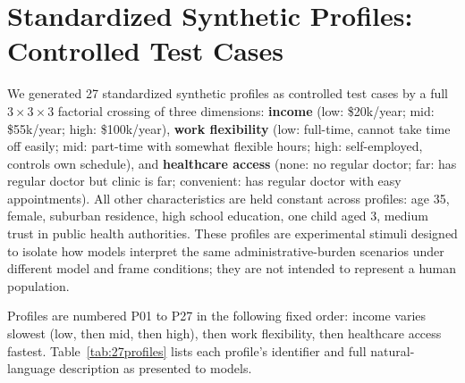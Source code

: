 \documentclass[11pt]{article}
\begin{document}
\clearpage   %
\section{Standardized Synthetic Profiles: Controlled Test Cases}
\label{app:profiles}

We generated 27 standardized synthetic profiles as controlled test cases by a full $3 \times 3 \times 3$ factorial crossing of three dimensions: \textbf{income} (low: \$20k/year; mid: \$55k/year; high: \$100k/year), \textbf{work flexibility} (low: full-time, cannot take time off easily; mid: part-time with somewhat flexible hours; high: self-employed, controls own schedule), and \textbf{healthcare access} (none: no regular doctor; far: has regular doctor but clinic is far; convenient: has regular doctor with easy appointments). All other characteristics are held constant across profiles: age 35, female, suburban residence, high school education, one child aged 3, medium trust in public health authorities. These profiles are experimental stimuli designed to isolate how models interpret the same administrative-burden scenarios under different model and frame conditions; they are not intended to represent a human population.

Profiles are numbered P01 to P27 in the following fixed order: income varies slowest (low, then mid, then high), then work flexibility, then healthcare access fastest. Table~\ref{tab:27profiles} lists each profile's identifier and full natural-language description as presented to models.
\end{document}
